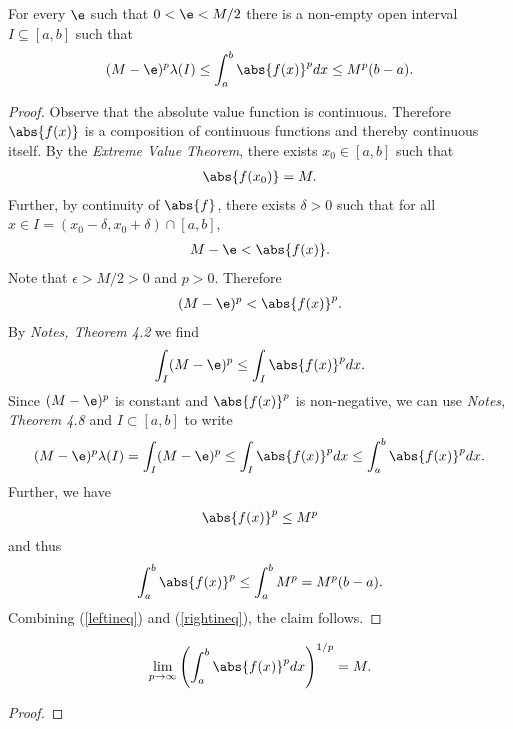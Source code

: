 \documentclass{article}
\begin{document}
\begin{claim*}
   For every $\e$ such that $0<\e<M/2$ there is a non-empty open interval $I\subseteq[a,b]$
   such that 
   \begin{align}
      \label{fullineq}
      (M-\e)^p\lambda(I)\leq \int_a^b \abs{f(x)}^p dx \leq M^p(b-a).
   \end{align}
\end{claim*}
\begin{proof}
   Observe that the absolute value function is continuous. Therefore $\abs{f(x)}$
   is a composition of continuous functions and thereby continuous itself.
   By the \emph{Extreme Value Theorem}, there exists $x_0\in[a,b]$ such that 
   \begin{align*}
      \abs{f(x_0)} = M.
   \end{align*}
   Further, by continuity of $\abs{f}$, there exists $\delta>0$ such that for all 
   $x\in I=(x_0-\delta, x_0+\delta)\cap[a,b]$,
   \begin{align*}
      M-\e < \abs{f(x)}.
   \end{align*}
   Note that $\epsilon > M/2 > 0$ and $p>0$. Therefore 
   \begin{align*}
      (M-\e)^p < \abs{f(x)}^p.
   \end{align*}
   By \emph{Notes, Theorem 4.2} we find 
   \begin{align*}
      \int_I (M-\e)^p \leq \int_I \abs{f(x)}^pdx.
   \end{align*}
   Since $(M-\e)^p$ is constant and $\abs{f(x)}^p$ is non-negative, we can use 
   \emph{Notes, Theorem 4.8} and $I\subset [a,b]$ to write
   \begin{align}
      \label{leftineq}
      (M-\e)^p \lambda(I)=
      \int_I (M-\e)^p \leq \int_I \abs{f(x)}^pdx
      \leq \int_a^b \abs{f(x)}^p dx.
   \end{align}
   Further, we have
   \begin{align*}
      \abs{f(x)}^p \leq M^p
   \end{align*}
   and thus 
   \begin{align}
      \label{rightineq}
      \int_a^b \abs{f(x)}^p \leq \int_a^b M^p = M^p(b-a).
   \end{align}
   Combining (\ref{leftineq}) and (\ref{rightineq}), the claim follows.
\end{proof}

\begin{claim*}
   \begin{align*}
      \lim_{p\to\infty} \left(\int_a^b \abs{f(x)}^p dx\right)^{1/p} = M.
   \end{align*}
\end{claim*}
\begin{proof}
\end{proof}
\end{document}
